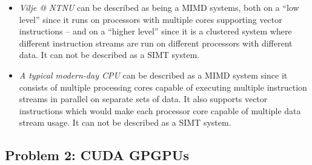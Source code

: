 \begin{enumerate}
\begin{itemize}
\item
\textit{Vilje @ NTNU} can be described as being a \ac{MIMD} systems, both on a ``low level'' since it runs on processors with multiple cores supporting vector instructions -- and on a ``higher level'' since it is a clustered system where different instruction streams are run on different processors with different data. It can not be described as a \ac{SIMT} system.

\item
\textit{A typical modern-day \ac{CPU}} can be described as a \ac{MIMD} system since it consists of multiple processing cores capable of executing multiple instruction streams in parallel on separate sets of data. It also supports vector instructions which would make each processor core capable of multiple data stream usage. It can not be described as a \ac{SIMT} system.

\end{itemize}

\end{enumerate}

\subsection*{Problem 2: CUDA GPGPUs}

